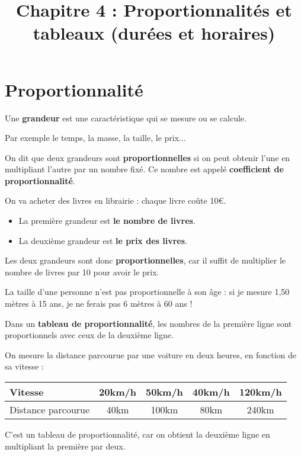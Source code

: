 \documentclass[a4paper,11pt]{article}
\title{Chapitre 4 : Proportionnalités et tableaux (durées et horaires)}
\date{}
\author{}
\begin{document}
\maketitle

\section{Proportionnalité}

\begin{vocabulaire}[Grandeur]
	Une \textbf{grandeur} est une caractéristique qui se mesure ou se calcule.

	Par exemple le temps, la masse, la taille, le prix...
\end{vocabulaire}

\begin{cours}
	On dit que deux grandeurs sont \textbf{proportionnelles} si on peut obtenir l'une en multipliant l'autre par un nombre fixé. Ce nombre est appelé \textbf{coefficient de proportionnalité}.
\end{cours}

\begin{exemple}
	On va acheter des livres en librairie : chaque livre coûte 10€.

	\begin{itemize}
		\item La première grandeur est \textbf{le nombre de livres}.
		\item La deuxième grandeur est \textbf{le prix des livres}.
	\end{itemize}

	Les deux grandeurs sont donc \textbf{proportionnelles}, car il suffit de multiplier le nombre de livres par 10 pour avoir le prix.
\end{exemple}

\begin{exemple}
	La taille d'une personne n'est pas proportionnelle à son âge : si je mesure 1,50 mètres à 15 ans, je ne ferais pas 6 mètres à 60 ans !
\end{exemple}

\begin{cours}
	Dans un \textbf{tableau de proportionnalité}, les nombres de la première ligne sont proportionnels avec ceux de la deuxième ligne.
\end{cours}

\begin{exemple}
	On mesure la distance parcourue par une voiture en deux heures, en fonction de sa vitesse : \vspace{0.5em}

	\begin{tabular}{|l|c|c|c|c|}
		\hline
		Vitesse            & 20km/h & 50km/h & 40km/h & 120km/h \\ \hline
		Distance parcourue & 40km   & 100km  & 80km   & 240km   \\ \hline
	\end{tabular}

	C'est un tableau de proportionnalité, car on obtient la deuxième ligne en multipliant la première par deux.
\end{exemple}
\end{document}
